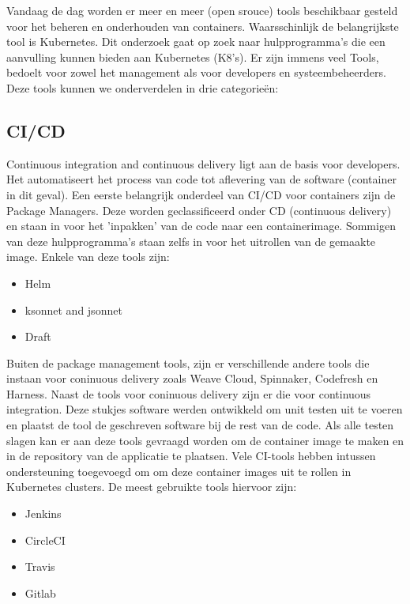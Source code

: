 Vandaag de dag worden er meer en meer (open srouce) tools beschikbaar gesteld voor het beheren en onderhouden van containers. Waarsschinlijk de belangrijkste tool is Kubernetes. Dit onderzoek gaat op zoek naar hulpprogramma's die een aanvulling kunnen bieden aan Kubernetes (K8's). Er zijn immens veel Tools, bedoelt voor zowel het management als voor developers en systeembeheerders. Deze tools kunnen we onderverdelen in drie categorieën:

\subsection{CI/CD}
Continuous integration and continuous delivery ligt aan de basis voor developers. Het automatiseert het process van code tot aflevering van de software (container in dit geval). Een eerste belangrijk onderdeel van CI/CD voor containers zijn  de Package Managers. Deze worden geclassificeerd onder CD (continuous delivery) en staan in voor het 'inpakken' van de code naar een containerimage. Sommigen van deze hulpprogramma's staan zelfs in voor het uitrollen van de gemaakte image. Enkele van deze tools zijn:
\begin{itemize}
    \item Helm
    \item ksonnet and jsonnet
    \item Draft
\end{itemize}
Buiten de package management tools, zijn er verschillende andere tools die instaan voor coninuous delivery zoals Weave Cloud, Spinnaker, Codefresh en Harness. Naast de tools voor coninuous delivery zijn er die voor continuous integration. Deze stukjes software werden ontwikkeld om unit testen uit te voeren en plaatst de tool de geschreven software bij de rest van de code. Als alle testen slagen kan er aan deze tools gevraagd worden om de container image te maken en in de repository van de applicatie te plaatsen. Vele CI-tools hebben intussen ondersteuning toegevoegd om om deze container images uit te rollen in Kubernetes clusters. De meest gebruikte tools hiervoor zijn:
\begin{itemize}
    \item Jenkins
    \item CircleCI
    \item Travis
    \item Gitlab
\end{itemize}
